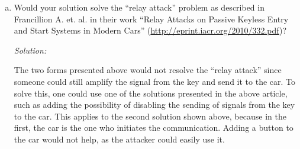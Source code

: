 \documentclass[a4paper,11pt]{article}
\newcommand{\includeonlyinsolution}[1]{\ifsolution#1\fi}
\newenvironment{solution}%
{\par{\noindent\small\textit{Solution:}}\vspace{-12pt}\begin{framed}}%
{\end{framed}\par}
\begin{document}
\begin{enumerate}[(a)]
\item Would your solution solve the ``relay attack'' problem as described in
  Francillion A. et. al. in their work ``Relay
  Attacks on Passive Keyless Entry and Start Systems in Modern Cars'' (\url{http://eprint.iacr.org/2010/332.pdf})?
\includeonlyinsolution{\begin{solution}
The two forms presented above would not resolve the ``relay attack'' since someone
could still amplify the signal from the key and send it to the car. To solve this,
one could use one of the solutions presented in the above article, such as adding the
possibility of disabling the sending of signals from the key to the car. This applies
to the second solution shown above, because in the first, the car is the one who initiates
the communication. Adding a button to the car would not help, as the attacker could easily
use it.
\end{solution}}
\end{enumerate}
\end{document}
